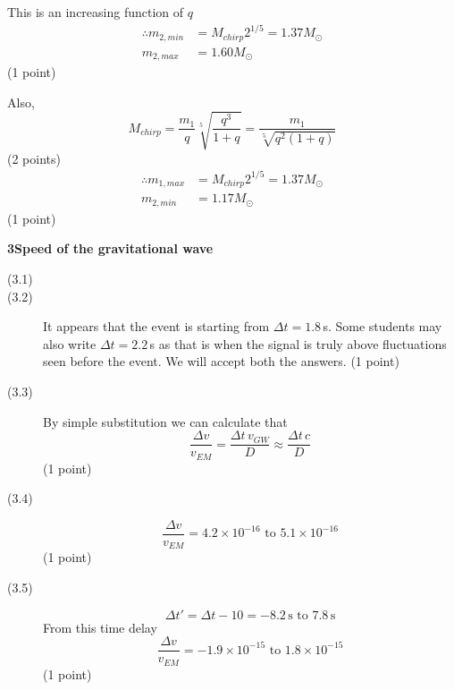 \begin{description}
  This is an increasing function of $q$
  \begin{align*}
    \therefore m_{2,min} &= M_{chirp} 2^{1/5} = 1.37 M_\odot \\
    m_{2,max} &= 1.60 M_\odot
  \end{align*}
  \hfill(1 point)

  Also,
  \[ M_{chirp} = \frac{m_1}{q}\sqrt[5]{\frac{q^3}{1+q}}
     = \frac{m_1}{\sqrt[5]{q^2(1+q)}} \]
  \hfill(2 points)
  \begin{align*}
    \therefore m_{1,max} &= M_{chirp} 2^{1/5} = 1.37 M_\odot \\
    m_{2,min} &= 1.17 M_\odot
  \end{align*}
  \hfill(1 point)
\end{description}

\noindent\textbf{3\quad Speed of the gravitational wave}
\begin{description}
\item[(3.1)]

\item[(3.2)] It appears that the event is starting from $\Delta t = 1.8$\,s.
  Some students may also write $\Delta t = 2.2$\,s as that is when the signal
  is truly above fluctuations seen before the event. We will accept both the
  answers. \hfill(1 point)

\item[(3.3)] By simple substitution we can calculate that
  \[ \frac{\Delta v}{v_{EM}} = \frac{\Delta t\, v_{GW}}{D}
     \approx \frac{\Delta t\, c}{D} \]
  \hfill(1 point)

\item[(3.4)]
  \[ \frac{\Delta v}{v_{EM}} = 4.2 \times 10^{-16}
     \text{ to } 5.1 \times 10^{-16} \]
  \hfill(1 point)

\item[(3.5)]
  \[ \Delta t' = \Delta t - 10 = -8.2\,\mathrm{s} \text{ to } 7.8\,\mathrm{s} \]
  From this time delay
  \[ \frac{\Delta v}{v_{EM}} = -1.9 \times 10^{-15}
     \text{ to } 1.8 \times 10^{-15} \]
  \hfill(1 point)
\end{description}
